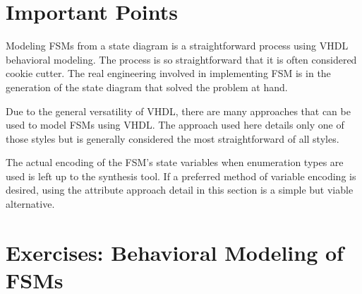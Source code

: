 \section{Important Points}

\begin{my_list}
\item Modeling FSMs from a state diagram is a straightforward process using VHDL behavioral modeling. The process is so straightforward that it is often considered cookie cutter. The real engineering involved in implementing FSM is in the generation of the state diagram that solved the problem at hand.

\item Due to the general versatility of VHDL, there are many approaches that can be used to model FSMs using VHDL. The approach used here details only one of those styles but is generally considered the most straightforward of all styles. 

\item The actual encoding of the FSM's state variables when enumeration types are used is left up to the synthesis tool. If a preferred method of variable encoding is desired, using the attribute approach detail in this section is a simple but viable alternative. 
\end{my_list}

\section{Exercises: Behavioral Modeling of FSMs}
\label{finite_state_machine_design_using_vhdl_exercises}

